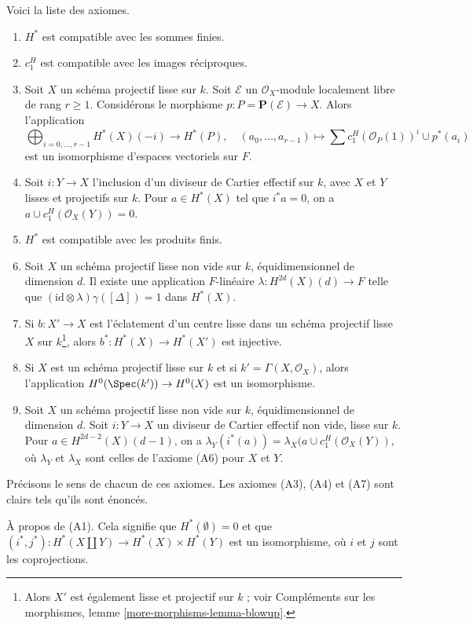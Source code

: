 \medskip\noindent
Voici la liste des axiomes.
\begin{enumerate}
\item[(A1)] $H^*$ est compatible avec les sommes finies.
\item[(A2)] $c_1^H$ est compatible avec les images réciproques.
\item[(A3)] Soit $X$ un schéma projectif lisse sur $k$.
Soit $\mathcal{E}$ un $\mathcal{O}_X$-module localement libre de rang $r \geq 1$.
Considérons le morphisme $p : P = \mathbf{P}(\mathcal{E}) \to X$.
Alors l'application
$$
\bigoplus\nolimits_{i = 0, \ldots, r - 1} H^*(X)(-i)
\longrightarrow H^*(P),\quad
(a_0, \ldots, a_{r - 1}) \longmapsto
\sum c_1^H(\mathcal{O}_P(1))^i \cup p^*(a_i)
$$
est un isomorphisme d'espaces vectoriels sur $F$.
\item[(A4)] Soit $i : Y \to X$ l'inclusion d'un diviseur de Cartier
effectif sur $k$, avec $X$ et $Y$ lisses et projectifs
sur $k$. Pour $a \in H^*(X)$ tel que
$i^*a = 0$, on a $a \cup c_1^H(\mathcal{O}_X(Y)) = 0$.
\item[(A5)] $H^*$ est compatible avec les produits finis.
\item[(A6)] Soit $X$ un schéma projectif lisse non vide sur $k$,
équidimensionnel de dimension $d$. Il existe une application
$F$-linéaire $\lambda : H^{2d}(X)(d) \to F$ telle que
$(\text{id} \otimes \lambda) \gamma([\Delta]) =  1$ dans $H^*(X)$.
\item[(A7)] Si $b : X' \to X$ est l'éclatement d'un centre
lisse dans un schéma projectif lisse $X$ sur $k$\footnote{Alors $X'$
est également lisse et projectif sur $k$ ; voir
Compléments sur les morphismes, lemme \ref{more-morphisms-lemma-blowup}.}, alors
$b^* : H^*(X) \to H^*(X')$ est injective.
\item[(A8)] Si $X$ est un schéma projectif lisse sur $k$ et si
$k' = \Gamma(X, \mathcal{O}_X)$, alors l'application $H^0(\Spec(k')) \to H^0(X)$
est un isomorphisme.
\item[(A9)] Soit $X$ un schéma projectif lisse non vide sur $k$,
équidimensionnel de dimension $d$. Soit $i : Y \to X$ un diviseur de Cartier
effectif non vide, lisse sur $k$. Pour $a \in H^{2d - 2}(X)(d - 1)$,
on a $\lambda_Y(i^*(a)) = \lambda_X(a \cup c_1^H(\mathcal{O}_X(Y))$, où
$\lambda_Y$ et $\lambda_X$ sont celles de l'axiome (A6) pour $X$ et $Y$.
\end{enumerate}
Précisons le sens de chacun de ces axiomes.
Les axiomes (A3), (A4) et (A7) sont clairs tels qu'ils sont énoncés.

\medskip\noindent
À propos de (A1). Cela signifie que $H^*(\emptyset) = 0$ et que
$(i^*, j^*) : H^*(X \amalg Y) \to H^*(X) \times H^*(Y)$
est un isomorphisme, où $i$ et $j$ sont les coprojections.

